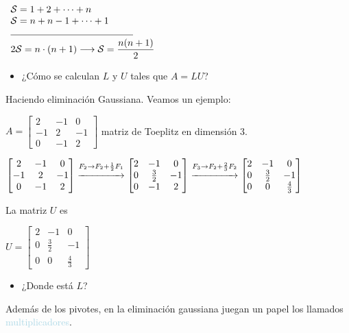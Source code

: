 \documentclass[12pt]{article}
\begin{document}
$\begin{array}{l}
\mathcal{S} = 1+2+\cdots+n\\
\mathcal{S} = n+n-1+\cdots+1\\
\rule{4.5cm}{0.4pt}\\
2\mathcal{S} = n\cdot(n+1)\longrightarrow
\mathcal{S}=\dfrac{n(n+1)}{2}
\end{array}$

\begin{itemize}[label=\color{red}\textbullet, leftmargin=*]
\item \color{lightblue} ¿Cómo se calculan $L$ y $U$ tales que
$A=LU$?
\end{itemize}
Haciendo eliminación Gaussiana. Veamos un ejemplo:

$A=\begin{bmatrix}
2 & -1 & 0 \\ 
-1 & 2 & -1 \\ 
0 & -1 & 2
\end{bmatrix}$ matriz de Toeplitz en dimensión 3.

$\begin{bmatrix}
2 & -1 & 0 \\ 
-1 & 2 & -1 \\ 
0 & -1 & 2
\end{bmatrix}\overset{F_2\rightarrow
F_2+\frac{1}{2}F_1}{\xrightarrow{\hspace{1.5cm}}}\begin{bmatrix}
2 & -1 & 0 \\ 
0 & \frac{3}{2} & -1 \\ 
0 & -1 & 2
\end{bmatrix}\overset{F_3\rightarrow
F_2+\frac{2}{3}F_2}{\xrightarrow{\hspace{1.5cm}}}\begin{bmatrix}
2 & -1 & 0 \\ 
0 & \frac{3}{2} & -1 \\ 
0 & 0 & \frac{4}{3}
\end{bmatrix} $

La matriz $U$ es 

$U=\begin{bmatrix}
2 & -1 & 0 \\ 
0 & \frac{3}{2} & -1 \\ 
0 & 0 & \frac{4}{3}
\end{bmatrix} $
\begin{itemize}[label=\color{red}\textbullet, leftmargin=*]
    \item \color{lightblue} ¿Donde está $L$?
\end{itemize}
Además de los pivotes, en la eliminación gaussiana juegan un
papel los llamados \textcolor{lightblue}{multiplicadores}.
\end{document}
